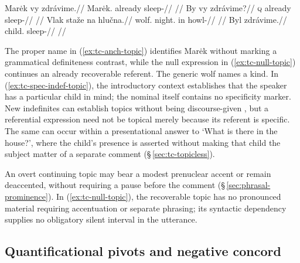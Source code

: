 \pex\label{ex:tc-topic-types}
\a\label{ex:tc-anch-topic}%
\begingl
\gla Marėk vy zdrávime.//
\glb Marėk.\Dir{} already sleep-\Prog{}//
\glft {} //
\endgl
\a\label{ex:tc-null-topic}%
\begingl
\gla By vy zdrávime?//
\glb \textsc{q} already sleep-\Prog{}//
\glft {} //
\endgl
\a\label{ex:tc-generic-topic}%
\begingl
\gla Vlak staže na hlučna.//
\glb wolf.\Dir{} night.\Ind{} in howl-\Cont{}//
\glft {} //
\endgl
\a\label{ex:tc-spec-indef-topic}%
\begingl
\gla Byl zdrávime.//
\glb child.\Dir{} sleep-\Prog{}//
\glft {}
      //
\endgl
\xe

\noindent The proper name in (\ref{ex:tc-anch-topic}) identifies Marėk
 without marking a grammatical definiteness contrast, while the null expression
 in (\ref{ex:tc-null-topic}) continues an already recoverable referent. The
 generic wolf names a kind. In (\ref{ex:tc-spec-indef-topic}), the introductory
 context establishes that the speaker has a particular child in mind; the
 nominal itself contains no specificity marker. New indefinites can establish
 topics without being discourse-given \cite[§\,5.1]{krifka2008}, but a
 referential expression need not be topical merely because its referent is
 specific. The same  can occur within a presentational answer to
 `What is there in the house?', where the child's presence is asserted without
 making that child the subject matter of a separate comment
 (§\,\ref{sec:tc-topicless}).

An overt continuing topic may bear a modest prenuclear accent or remain
 deaccented, without requiring a pause before the comment
 (§\,\ref{sec:phrasal-prominence}). In (\ref{ex:tc-null-topic}), the
 recoverable topic has no pronounced material requiring accentuation or
 separate phrasing; its syntactic dependency supplies no obligatory silent
 interval in the utterance.

\subsection{Quantificational pivots and negative concord}
\label{sec:tc-quantificational-pivots}

